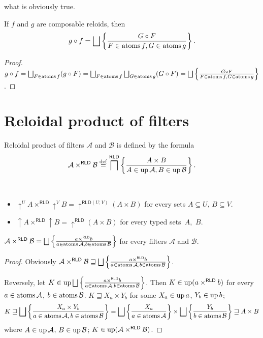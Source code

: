 what is obviously true.
\begin{cor}
\label{rld-comp-at}If $f$ and $g$ are composable reloids, then
\[
g\circ f=\bigsqcup\left\{ \frac{G\circ F}{F\in\operatorname{atoms} f,G\in\operatorname{atoms} g}\right\}.
\]
\end{cor}
\begin{proof}
$g\circ f=\bigsqcup_{F\in\operatorname{atoms} f}(g\circ F)=\bigsqcup_{F\in\operatorname{atoms} f}\bigsqcup_{G\in\operatorname{atoms} g}(G\circ F)=\bigsqcup\left\{ \frac{G\circ F}{F\in\operatorname{atoms} f,G\in\operatorname{atoms} g}\right\}$.
\end{proof}

\section{Reloidal product of filters}
\begin{defn}
Reloidal product of filters $\mathcal{A}$
and $\mathcal{B}$ is defined by the formula
\[
\mathcal{A}\times^{\mathsf{RLD}}\mathcal{B}\overset{\mathrm{def}}{=}\bigsqcap^{\mathsf{RLD}}\left\{ \frac{A\times B}{A\in\operatorname{up}\mathcal{A},B\in\operatorname{up}\mathcal{B}}\right\}.
\]
\end{defn}
\begin{obvious}
~\end{obvious}
\begin{itemize}
\item $\uparrow^{U}A\times^{\mathsf{RLD}}\uparrow^{V}B=\uparrow^{\mathsf{RLD}(U;V)}(A\times B)$
for every sets $A\subseteq U$, $B\subseteq V$.
\item $\uparrow A\times^{\mathsf{RLD}}\uparrow B=\uparrow^{\mathsf{RLD}}(A\times B)$
for every typed sets~$A$,~$B$.\end{itemize}
\begin{thm}
\label{rld-prod-t-atoms}$\mathcal{A}\times^{\mathsf{RLD}}\mathcal{B}=\bigsqcup\left\{ \frac{a\times^{\mathsf{RLD}}b}{a\in\operatorname{atoms}\mathcal{A},b\in\operatorname{atoms}\mathcal{B}}\right\}$
for every filters $\mathcal{A}$ and $\mathcal{B}$.\end{thm}
\begin{proof}
Obviously $\mathcal{A}\times^{\mathsf{RLD}}\mathcal{B}\sqsupseteq\bigsqcup\left\{ \frac{a\times^{\mathsf{RLD}}b}{a\in\operatorname{atoms}\mathcal{A},b\in\operatorname{atoms}\mathcal{B}}\right\}$.

Reversely, let $K\in\operatorname{up}\bigsqcup\left\{ \frac{a\times^{\mathsf{RLD}}b}{a\in\operatorname{atoms}\mathcal{A},b\in\operatorname{atoms}\mathcal{B}}\right\}$.
Then $K\in\operatorname{up}(a\times^{\mathsf{RLD}}b)$ for every $a\in\operatorname{atoms}\mathcal{A}$,
$b\in\operatorname{atoms}\mathcal{B}$. $K\sqsupseteq X_{a}\times Y_{b}$ for some
$X_{a}\in\operatorname{up} a$, $Y_{b}\in\operatorname{up} b$; 
\[
K\sqsupseteq\bigsqcup\left\{ \frac{X_{a}\times Y_{b}}{a\in\operatorname{atoms}\mathcal{A},b\in\operatorname{atoms}\mathcal{B}}\right\}=\bigsqcup\left\{ \frac{X_{a}}{a\in\operatorname{atoms}\mathcal{A}}\right\}\times\bigsqcup\left\{ \frac{Y_{b}}{b\in\operatorname{atoms}\mathcal{B}}\right\}\sqsupseteq A\times B
\]
 where $A\in\operatorname{up}\mathcal{A}$, $B\in\operatorname{up}\mathcal{B}$; $K\in\operatorname{up}(\mathcal{A}\times^{\mathsf{RLD}}\mathcal{B})$.\end{proof}
